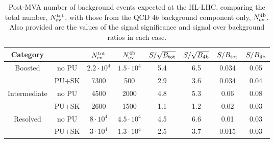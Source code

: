 \begin{table}[h]
  \centering
  \small
  \begin{tabular}{|c|c|c|c||c|c||c|c|}
        \hline
        Category  &    &  $N_{\rm ev}^{\rm tot}$  &  $N_{\rm ev}^{\rm 4b}$   &
        $S/\sqrt{B_{\rm tot}}$ & $S/\sqrt{B_{\rm 4b}}$  
        &  $S/B_{\rm tot}$ & $S/B_{\rm 4b}$\\ 
    \hline
    \hline
    \multirow{2}{*}{Boosted} &  no PU  & $2.2\cdot 10^4$  & $1.5\cdot 10^4$     & 
      5.4 &  6.5 & 0.034 & 0.05 \\
    & PU+SK & 7300  &  500  &  2.9  & 3.6 &  0.034 & 0.04 \\
    \hline
    \hline
    \multirow{2}{*}{Intermediate} &  no PU   & 4500  & 2000    &
    4.8  &  5.3 &  0.06  &  0.08 \\
    & PU+SK  & 2600   &  1500  & 1.1  & 1.2 & 0.02 & 0.03 \\
    \hline
    \hline
    \multirow{2}{*}{Resolved} &   no PU  & $8\cdot 10^4$   &
    $4.5\cdot 10^4$
    & 4.5  & 6.6  & 0.01 & 0.03 \\
    & PU+SK  &  $3\cdot 10^4$   &   $1.3\cdot 10^4$ & 2.5    & 3.7  & 0.015 & 0.03 \\
    \hline
      \end{tabular}
  \caption{\small Post-MVA number of background events
    expected at the HL-LHC, comparing the total number, $N_{\rm ev}^{\rm tot}$,
    with those from the QCD $4b$ background
    component only, $N_{\rm ev}^{\rm 4b}$.
    Also provided are the values of the signal 
    significance and signal over background ratios in each case.
        \label{table:cutflowMVA_fakes}
  }
\end{table}

